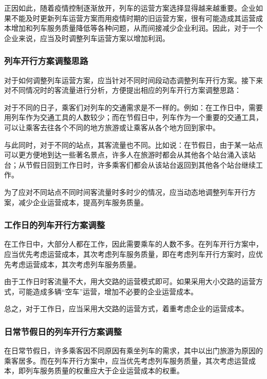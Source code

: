 正因如此，随着疫情控制逐渐放开，列车的运营方案选择显得越来越重要。企业如果不能及时更新列车运营方案而用疫情时期的旧运营方案，很有可能造成其运营成本增加和列车服务质量降低等各种问题，从而间接减少企业利润。因此，对于一个企业来说，应当及时调整列车运营方案以增加利润。

\subsubsection{列车开行方案调整思路}

对于如何调整列车运营方案，应当针对不同时间段动态调整列车开行方案。接下来对不同情况时的客流量进行分析，方便提出相应的列车开行方案调整思路：

对于不同的日子，乘客们对列车的交通需求是不一样的。例如：在工作日中，需要用列车作为交通工具的人数较少；而在节假日中，列车作为一个重要的交通工具，可以让乘客去往各个不同的地方旅游或让乘客从各个地方回到家中。

与此同时，对于不同的站点，其客流量也不同。比如说：在节假日，由于某一站点可以更方便地到达一些著名景点，许多人在旅游时都会从其他各个站台涌入该站台；从节假日回到工作日时，许多乘客们都会从该站台返回到其他各个站台继续工作。

为了应对不同站点不同时间客流量时多时少的情况，应当动态地调整列车开行方案，减少企业运营成本，提高列车服务质量。

\subsubsection{工作日的列车开行方案调整}

在工作日中，大部分人都在工作，因此需要乘车的人数不多。在列车开行方案中，应当优先考虑运营成本，其次考虑列车服务质量，即在考虑列车开行方案时，应优先考虑运营成本，其次考虑列车服务质量。

由于工作日时客流量不大，用大交路的运营模式即可。如果采用大小交路的运营方式，可能造成多辆“空车”运营，增加不必要的企业运营成本。

总之，对于工作日，应当采用大交路的运营方式，着重考虑企业的运营成本。

\subsubsection{日常节假日的列车开行方案调整}

在日常节假日，许多乘客因不同原因有乘坐列车的需求，其中以出门旅游为原因的乘客居多。而在列车开行方案中，应当优先考虑列车服务质量，其次考虑运营成本，即列车服务质量的权重应大于企业运营成本的权重。

